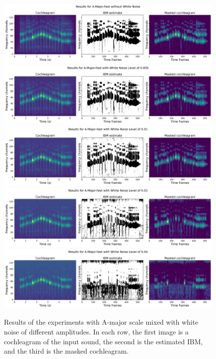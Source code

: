 \begin{figure}[htp]
	\centering
	\includegraphics[width=\textwidth]{include/experiments_A-major-fast_WN_0,0.jpg}
	\includegraphics[width=\textwidth]{include/experiments_A-major-fast_WN_0,005.jpg}
	\includegraphics[width=\textwidth]{include/experiments_A-major-fast_WN_0,01.jpg}
	\includegraphics[width=\textwidth]{include/experiments_A-major-fast_WN_0,02.jpg}
	\includegraphics[width=\textwidth]{include/experiments_A-major-fast_WN_0,04.jpg}
	\caption[Results of experiments with white noise levels]{Results of the experiments with A-major scale mixed with white noise of different amplitudes. In each row, the first image is a cochleagram of the input sound, the second is the estimated IBM, and the third is the masked cochleagram.}
	\label{img:white_noise_experiments}
\end{figure}


